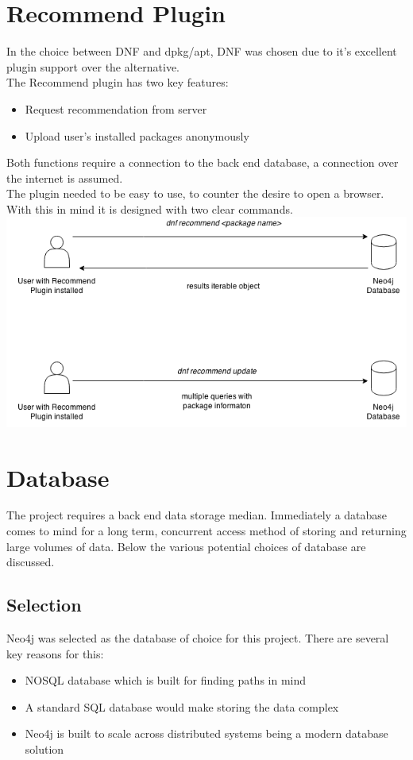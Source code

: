 \documentclass{l4proj}
\begin{document}
\section{Recommend Plugin}
In the choice between DNF and dpkg/apt, DNF was chosen due to it's excellent plugin support over the alternative.\\
The Recommend plugin has two key features:
\begin{itemize}
\item Request recommendation from server
\item Upload user's installed packages anonymously
\end{itemize}
Both functions require a connection to the back end database, a connection over the internet is assumed.\\
The plugin needed to be easy to use, to counter the desire to open a browser. With this in mind it is designed with two clear commands.\\
\includegraphics[scale=0.75]{images/recommend_api.png}


\section{Database}
The project requires a back end data storage median. Immediately a database comes to mind for a long term, concurrent access method of storing and returning large volumes of data. Below the various potential choices of database are discussed.

\subsection{Selection}
Neo4j was selected as the database of choice for this project. There are several key reasons for this:
\begin{itemize}
\item NOSQL database which is built for finding paths in mind
\item A standard SQL database would make storing the data complex
\item Neo4j is built to scale across distributed systems being a modern database solution
\end{itemize}
\end{document}
